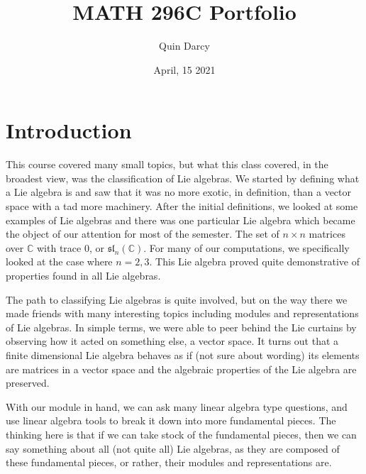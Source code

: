 \documentclass[12pt]{article}
\theoremstyle{definition}
\theoremstyle{definition}
\begin{document}
\title{MATH 296C Portfolio}
\author{Quin Darcy}
\date{April, 15 2021}
\maketitle
\newpage
\tableofcontents\newpage
\section{Introduction}
This course covered many small topics, but what this class covered, in the 
broadest view, was the classification of Lie algebras. We started by defining 
what a Lie algebra is and saw that it was no more exotic, in definition, than 
a vector space with a tad more machinery. After the initial definitions, we looked 
at some examples of Lie algebras and there was one particular Lie algebra which 
became the object of our attention for most of the semester. The set of $n\times n$ 
matrices over $\mathbb{C}$ with trace 0, or $\mathfrak{sl}_n(\mathbb{C})$. For many 
of our computations, we specifically looked at the case where $n=2,3$. This Lie 
algebra proved quite demonstrative of properties found in all Lie algebras.
\par The path to classifying Lie algebras is quite involved, but on the way there 
we made friends with many interesting topics including modules and representations of
Lie algebras. In simple terms, we were able to peer behind the Lie curtains by observing 
how it acted on something else, a vector space. It turns out that a finite dimensional 
Lie algebra behaves as if (not sure about wording) its elements are matrices in a vector 
space and the algebraic properties of the Lie algebra are preserved. \par With our module 
in hand, we can ask many linear algebra type questions, and use linear algebra tools to
break it down into more fundamental pieces. The thinking here is that if we can take 
stock of the fundamental pieces, then we can say something about all (not quite all) Lie
algebras, as they are composed of these fundamental pieces, or rather, their modules and 
representations are.
\end{document}
